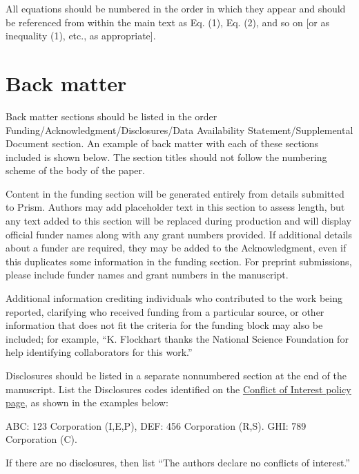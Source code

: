 \documentclass{optica-article}
\begin{document}
All equations should be numbered in the order in which they appear
and should be referenced  from within the main text as Eq. (1),
Eq. (2), and so on [or as inequality (1), etc., as appropriate].

\section{Back matter}

Back matter sections should be listed in the order Funding/Acknowledgment/Disclosures/Data Availability Statement/Supplemental Document section. An example of back matter with each of these sections included is shown below. The section titles should not follow the numbering scheme of the body of the paper. 

\begin{backmatter}
Content in the funding section will be generated entirely from details submitted to Prism. Authors may add placeholder text in this section to assess length, but any text added to this section will be replaced during production and will display official funder names along with any grant numbers provided. If additional details about a funder are required, they may be added to the Acknowledgment, even if this duplicates some information in the funding section. For preprint submissions, please include funder names and grant numbers in the manuscript.

Additional information crediting individuals who contributed to the work being reported, clarifying who received funding from a particular source, or other information that does not fit the criteria for the funding block may also be included; for example, ``K. Flockhart thanks the National Science Foundation for help identifying collaborators for this work.'' 

Disclosures should be listed in a separate nonnumbered section at the end of the manuscript. List the Disclosures codes identified on the \href{https://opg.optica.org/submit/review/conflicts-interest-policy.cfm}{Conflict of Interest policy page}, as shown in the examples below:

\medskip

\noindent ABC: 123 Corporation (I,E,P), DEF: 456 Corporation (R,S). GHI: 789 Corporation (C).

\medskip

\noindent If there are no disclosures, then list ``The authors declare no conflicts of interest.''



\end{backmatter}
\end{document}

